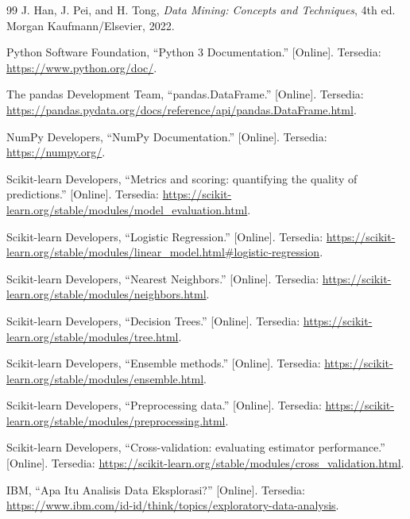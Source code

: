 \documentclass[a4paper,oneside,12pt]{report}
\renewcommand{\bibname}{Daftar Pustaka}
\begin{document}
\clearpage
{}
\renewcommand{\bibname}{Daftar Pustaka}
\begin{thebibliography}{99}
     J. Han, J. Pei, and H. Tong, \textit{Data Mining: Concepts and Techniques}, 4th ed. Morgan Kaufmann/Elsevier, 2022.

     Python Software Foundation, ``Python 3 Documentation.'' [Online]. Tersedia: \url{https://www.python.org/doc/}.

     The pandas Development Team, ``pandas.DataFrame.'' [Online]. Tersedia: \url{https://pandas.pydata.org/docs/reference/api/pandas.DataFrame.html}.

     NumPy Developers, ``NumPy Documentation.'' [Online]. Tersedia: \url{https://numpy.org/}.

     Scikit-learn Developers, ``Metrics and scoring: quantifying the quality of predictions.'' [Online]. Tersedia: \url{https://scikit-learn.org/stable/modules/model_evaluation.html}.

     Scikit-learn Developers, ``Logistic Regression.'' [Online]. Tersedia: \url{https://scikit-learn.org/stable/modules/linear_model.html\#logistic-regression}.

     Scikit-learn Developers, ``Nearest Neighbors.'' [Online]. Tersedia: \url{https://scikit-learn.org/stable/modules/neighbors.html}.

     Scikit-learn Developers, ``Decision Trees.'' [Online]. Tersedia: \url{https://scikit-learn.org/stable/modules/tree.html}.

     Scikit-learn Developers, ``Ensemble methods.'' [Online]. Tersedia: \url{https://scikit-learn.org/stable/modules/ensemble.html}.

     Scikit-learn Developers, ``Preprocessing data.'' [Online]. Tersedia: \url{https://scikit-learn.org/stable/modules/preprocessing.html}.

     Scikit-learn Developers, ``Cross-validation: evaluating estimator performance.'' [Online]. Tersedia: \url{https://scikit-learn.org/stable/modules/cross_validation.html}.

     IBM, ``Apa Itu Analisis Data Eksplorasi?'' [Online]. Tersedia: \url{https://www.ibm.com/id-id/think/topics/exploratory-data-analysis}.


\end{thebibliography}
\end{document}
